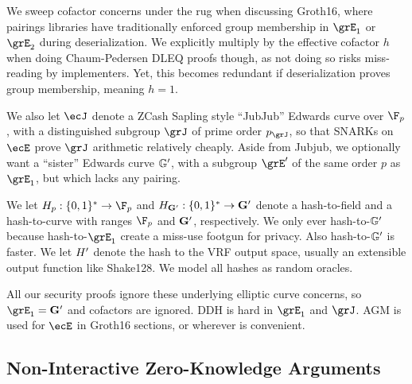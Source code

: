 We sweep cofactor concerns under the rug when discussing Groth16,
where pairings libraries have traditionally enforced group membership in
$\grE_1$ or $\grE_2$ during deserialization.  We explicitly multiply by the
effective cofactor $h$ when doing Chaum-Pedersen DLEQ proofs though, as not
doing so risks miss-reading by implementers.  Yet, this becomes redundant
if deserialization proves group membership, meaning $h=1$.

We also let $\ecJ$ denote a ZCash Sapling style ``JubJub'' Edwards curve
over $\F_p$, with a distinguished subgroup $\grJ$ of prime order $p_\grJ$,
so that SNARKs on $\ecE$ prove $\grJ$ arithmetic relatively cheaply.
Aside from Jubjub, we optionally want a ``sister'' Edwards curve ${\mathbb{G}'}$,
with a subgroup $\grE'$ of the same order $p$ as $\grE_1$,
 but which lacks any pairing.

We let $H_p : \{0,1\}^* \to \F_p$ and $H_{{\mathbf{G}'}} : \{0,1\}^* \to {\mathbf{G}'}$
denote a hash-to-field and a hash-to-curve with ranges $\F_p$ and ${\mathbf{G}'}$, respectively.  
We only ever hash-to-${\mathbb{G}'}$ because hash-to-$\grE_1$ create a miss-use
footgun for privacy.  Also hash-to-${\mathbb{G}'}$ is faster.
We let $H'$ denote the hash to the VRF output space,
 usually an extensible output function like Shake128.
We model all hashes as random oracles.

All our security proofs ignore these underlying elliptic curve concerns,
so $\grE_1 = \grEsis$ and cofactors are ignored. DDH is hard in $\grE_1$ and $\grJ$.
AGM is used for $\ecE$ in Groth16 sections, or wherever is convenient. 

\subsection{Non-Interactive Zero-Knowledge Arguments}

% 

